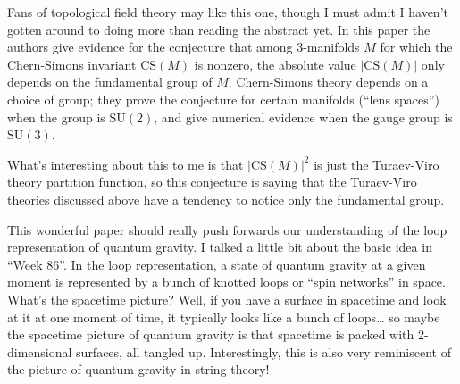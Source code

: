 \documentclass{article}
\def\tightlist{}
\renewcommand{\texttt}[1]{%
  \begingroup
  \ttfamily
  \begingroup\lccode`~=`/\lowercase{\endgroup\def~}{/\discretionary{}{}{}}%
  \begingroup\lccode`~=`[\lowercase{\endgroup\def~}{[\discretionary{}{}{}}%
  \begingroup\lccode`~=`.\lowercase{\endgroup\def~}{.\discretionary{}{}{}}%
  \catcode`/=\active\catcode`[=\active\catcode`.=\active
  \scantokens{#1\noexpand}%
  \endgroup
}
\begin{document}

Fans of topological field theory may like this one, though I must admit
I haven't gotten around to doing more than reading the abstract yet. In
this paper the authors give evidence for the conjecture that among
3-manifolds \(M\) for which the Chern-Simons invariant
\(\mathrm{CS}(M)\) is nonzero, the absolute value \(|\mathrm{CS}(M)|\)
only depends on the fundamental group of \(M\). Chern-Simons theory
depends on a choice of group; they prove the conjecture for certain
manifolds (``lens spaces'') when the group is \(\mathrm{SU}(2)\), and
give numerical evidence when the gauge group is \(\mathrm{SU}(3)\).

What's interesting about this to me is that \(|\mathrm{CS}(M)|^2\) is
just the Turaev-Viro theory partition function, so this conjecture is
saying that the Turaev-Viro theories discussed above have a tendency to
notice only the fundamental group.


This wonderful paper should really push forwards our understanding of
the loop representation of quantum gravity. I talked a little bit about
the basic idea in \protect\hyperlink{week86}{``Week 86''}. In the loop
representation, a state of quantum gravity at a given moment is
represented by a bunch of knotted loops or ``spin networks'' in space.
What's the spacetime picture? Well, if you have a surface in spacetime
and look at it at one moment of time, it typically looks like a bunch of
loops\ldots{} so maybe the spacetime picture of quantum gravity is that
spacetime is packed with 2-dimensional surfaces, all tangled up.
Interestingly, this is also very reminiscent of the picture of quantum
gravity in string theory!
\end{document}
